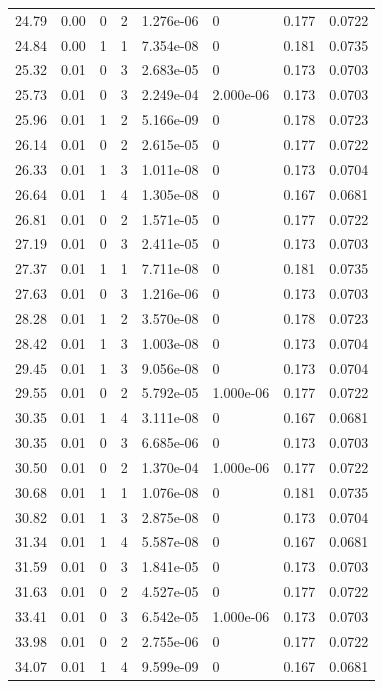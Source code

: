 \documentclass[preview]{standalone}
\begin{document}
{{{\begin{tabular}{L{1.2cm}C{1.2cm} C{0.3cm}C{0.5cm} C{1.4cm}C{1.4cm} C{1.4cm}C{1.4cm}}
  24.79  &  0.00  & 0     &  2 &  1.276e-06  & 0  & 0.177 &  0.0722   \\ 
  24.84  &  0.00  & 1     &  1 &  7.354e-08  & 0  & 0.181 &  0.0735   \\ 
  25.32  &  0.01  & 0     &  3 &  2.683e-05  & 0  & 0.173 &  0.0703   \\ 
  25.73  &  0.01  & 0     &  3 &  2.249e-04  & 2.000e-06  & 0.173 &  0.0703   \\ 
  25.96  &  0.01  & 1     &  2 &  5.166e-09  & 0  & 0.178 &  0.0723   \\ 
  26.14  &  0.01  & 0     &  2 &  2.615e-05  & 0  & 0.177 &  0.0722   \\ 
  26.33  &  0.01  & 1     &  3 &  1.011e-08  & 0  & 0.173 &  0.0704   \\ 
  26.64  &  0.01  & 1     &  4 &  1.305e-08  & 0  & 0.167 &  0.0681   \\ 
  26.81  &  0.01  & 0     &  2 &  1.571e-05  & 0  & 0.177 &  0.0722   \\ 
  27.19  &  0.01  & 0     &  3 &  2.411e-05  & 0  & 0.173 &  0.0703   \\ 
  27.37  &  0.01  & 1     &  1 &  7.711e-08  & 0  & 0.181 &  0.0735   \\ 
  27.63  &  0.01  & 0     &  3 &  1.216e-06  & 0  & 0.173 &  0.0703   \\ 
  28.28  &  0.01  & 1     &  2 &  3.570e-08  & 0  & 0.178 &  0.0723   \\ 
  28.42  &  0.01  & 1     &  3 &  1.003e-08  & 0  & 0.173 &  0.0704   \\ 
  29.45  &  0.01  & 1     &  3 &  9.056e-08  & 0  & 0.173 &  0.0704   \\ 
  29.55  &  0.01  & 0     &  2 &  5.792e-05  & 1.000e-06  & 0.177 &  0.0722   \\ 
  30.35  &  0.01  & 1     &  4 &  3.111e-08  & 0  & 0.167 &  0.0681   \\ 
  30.35  &  0.01  & 0     &  3 &  6.685e-06  & 0  & 0.173 &  0.0703   \\ 
  30.50  &  0.01  & 0     &  2 &  1.370e-04  & 1.000e-06  & 0.177 &  0.0722   \\ 
  30.68  &  0.01  & 1     &  1 &  1.076e-08  & 0  & 0.181 &  0.0735   \\ 
  30.82  &  0.01  & 1     &  3 &  2.875e-08  & 0  & 0.173 &  0.0704   \\ 
  31.34  &  0.01  & 1     &  4 &  5.587e-08  & 0  & 0.167 &  0.0681   \\ 
  31.59  &  0.01  & 0     &  3 &  1.841e-05  & 0  & 0.173 &  0.0703   \\ 
  31.63  &  0.01  & 0     &  2 &  4.527e-05  & 0  & 0.177 &  0.0722   \\ 
  33.41  &  0.01  & 0     &  3 &  6.542e-05  & 1.000e-06  & 0.173 &  0.0703   \\ 
  33.98  &  0.01  & 0     &  2 &  2.755e-06  & 0  & 0.177 &  0.0722   \\ 
  34.07  &  0.01  & 1     &  4 &  9.599e-09  & 0  & 0.167 &  0.0681   \\ 
\hline 
\end{tabular} 

}}}
\end{document}
